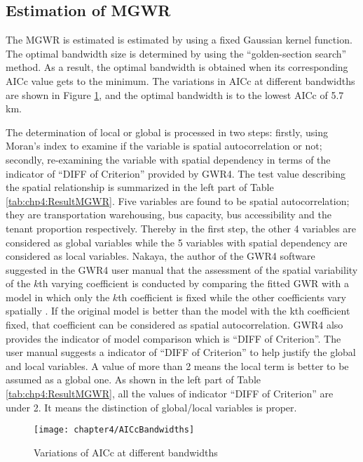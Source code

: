 %
\subsection{Estimation of MGWR}
%
The MGWR is estimated is estimated by using a fixed Gaussian kernel function. The optimal bandwidth size is determined by using the “golden-section search” method. As a result, the optimal bandwidth is obtained when its corresponding AICc value gets to the minimum. The variations in AICc at different bandwidths are shown in Figure \ref{fig:chp4:AICcBandwidths}, and the optimal bandwidth is to the lowest AICc of 5.7 km.

%
The determination of local or global is processed in two steps: firstly, using Moran’s index to examine if the variable is spatial autocorrelation or not; secondly, re-examining the variable with spatial dependency in terms of the indicator of “DIFF of Criterion” provided by GWR4. The test value describing the spatial relationship is summarized in the left part of Table \ref{tab:chp4:ResultMGWR}. Five variables are found to be spatial autocorrelation; they are transportation warehousing, bus capacity, bus accessibility and the tenant proportion respectively. Thereby in the first step, the other 4 variables are considered as global variables while the 5 variables with spatial dependency are considered as local variables. Nakaya, the author of the GWR4 software suggested in the GWR4 user manual that the assessment of the spatial variability of the $k$th varying coefficient is conducted by comparing the fitted GWR with a model in which only the $k$th coefficient is fixed while the other coefficients vary spatially \cite{nakaya2014gwr4}. If the original model is better than the model with the kth coefficient fixed, that coefficient can be considered as spatial autocorrelation. GWR4 also provides the indicator of model comparison which is “DIFF of Criterion”. The user manual suggests a indicator of “DIFF of Criterion” to help justify the global and local variables. A value of more than 2 means the local term is better to be assumed as a global one. As shown in the left part of Table \ref{tab:chp4:ResultMGWR}, all the values of indicator “DIFF of Criterion” are under 2. It means the distinction of global/local variables is proper. 

\begin{figure}[htbp]
	\centering
	\texttt{[image: chapter4/AICcBandwidths]}
	\caption{Variations of AICc at different bandwidths}
	\label{fig:chp4:AICcBandwidths}
\end{figure}

